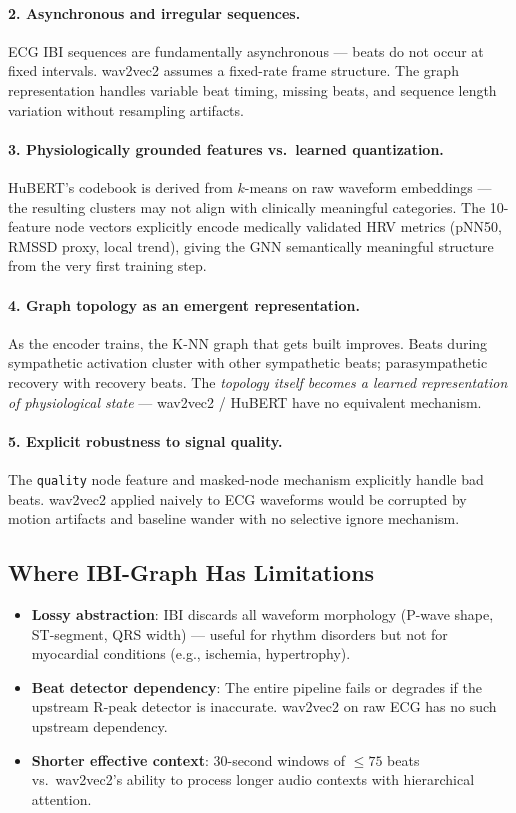 \documentclass[11pt,a4paper]{article}
\begin{document}
\paragraph{2. Asynchronous and irregular sequences.}
ECG IBI sequences are fundamentally asynchronous --- beats do not occur at fixed intervals.
wav2vec2 assumes a fixed-rate frame structure. The graph representation handles variable beat timing,
missing beats, and sequence length variation without resampling artifacts.

\paragraph{3. Physiologically grounded features vs.\ learned quantization.}
HuBERT's codebook is derived from $k$-means on raw waveform embeddings --- the resulting clusters
may not align with clinically meaningful categories. The 10-feature node vectors explicitly encode
medically validated HRV metrics (pNN50, RMSSD proxy, local trend), giving the GNN
semantically meaningful structure from the very first training step.

\paragraph{4. Graph topology as an emergent representation.}
As the encoder trains, the K-NN graph that gets built improves.
Beats during sympathetic activation cluster with other sympathetic beats;
parasympathetic recovery with recovery beats.
The \emph{topology itself becomes a learned representation of physiological state} ---
wav2vec2 / HuBERT have no equivalent mechanism.

\paragraph{5. Explicit robustness to signal quality.}
The \texttt{quality} node feature and masked-node mechanism explicitly handle bad beats.
wav2vec2 applied naively to ECG waveforms would be corrupted by motion artifacts and baseline wander
with no selective ignore mechanism.

\subsection{Where IBI-Graph Has Limitations}

\begin{itemize}[leftmargin=*]
    \item \textbf{Lossy abstraction}: IBI discards all waveform morphology (P-wave shape, ST-segment, QRS width) --- useful for rhythm disorders but not for myocardial conditions (e.g., ischemia, hypertrophy).
    \item \textbf{Beat detector dependency}: The entire pipeline fails or degrades if the upstream R-peak detector is inaccurate. wav2vec2 on raw ECG has no such upstream dependency.
    \item \textbf{Shorter effective context}: 30-second windows of $\leq75$ beats vs.\ wav2vec2's ability to process longer audio contexts with hierarchical attention.
\end{itemize}
\end{document}
